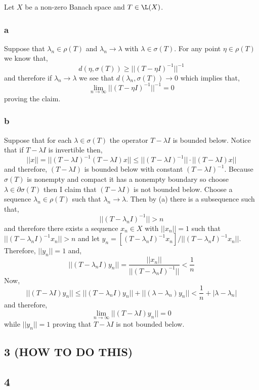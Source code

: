 \documentclass[12pt]{article}
\begin{document}
Let $X$ be a non-zero Banach space and $T \in \L(X)$.

\subsubsection{a}

Suppose that $\lambda_n \in \rho(T)$ and $\lambda_n \to \lambda$ with $\lambda \in \sigma(T)$. For any point $\eta \in \rho(T)$ we know that,
\[ d(\eta, \sigma(T)) \ge || (T - \eta I)^{-1} ||^{-1} \]
and therefore if $\lambda_n \to \lambda$ we see that $d(\lambda_n, \sigma(T)) \to 0$ which implies that,
\[ \lim_{n \to \infty} || (T - \eta I)^{-1} ||^{-1} = 0 \]
proving the claim.

\subsubsection{b}

Suppose that for each $\lambda \in \sigma(T)$ the operator $T - \lambda I$ is bounded below. Notice that if $T - \lambda I$ is invertible then,
\[ || x || = || (T - \lambda I)^{-1} (T - \lambda I) x || \le || (T - \lambda I)^{-1} || \cdot || (T - \lambda I) x || \]
and therefore, $(T - \lambda I)$ is bounded below with constant $(T - \lambda I)^{-1}$. Because $\sigma(T)$ is nonempty and compact it has a nonempty boundary so choose $\lambda \in \partial \sigma(T)$ then I claim that $(T - \lambda I)$ is not bounded below. Choose a sequence $\lambda_n \in \rho(T)$ such that $\lambda_n \to \lambda$. Then by (a) there is a subsequence such that,
\[ || (T - \lambda_n I)^{-1} || > n \]
and therefore there exists a sequence $x_n \in X$ with $|| x_n || = 1$ such that $|| (T - \lambda _n I)^{-1} x_n || > n$ and let $y_n = [(T - \lambda_n I)^{-1} x_n]/||(T - \lambda_n I)^{-1} x_n||$. Therefore, $|| y_n || = 1$ and,
\[ || (T - \lambda_n I) y_n || = \frac{|| x_n ||}{|| (T - \lambda_n I)^{-1}||} < \frac{1}{n} \]
Now,
\[ || (T - \lambda I) y_n || \le || (T - \lambda_n I) y_n || + || (\lambda - \lambda_n) y_n || < \frac{1}{n} + | \lambda - \lambda_n | \]
and therefore,
\[ \lim_{n \to \infty} || (T - \lambda I) y_n || = 0 \]
while $|| y_n || = 1$ proving that $T - \lambda I$ is not bounded below.

\subsection{3 (HOW TO DO THIS)}

\subsection{4}
\end{document}
